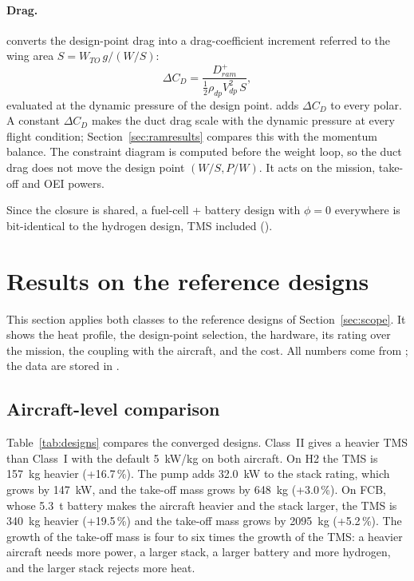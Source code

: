 \documentclass[a4paper,11pt]{article}
\begin{document}
\paragraph{Drag.}  converts the design-point drag into a
drag-coefficient increment referred to the wing area $S = W_{TO}\,g/(W/S)$:
\begin{equation}
  \Delta C_D = \frac{D_{ram}^{+}}{\tfrac12\rho_{dp}V_{dp}^2\,S},
  \label{eq:dcd}
\end{equation}
evaluated at the dynamic pressure of the design point.  adds
$\Delta C_D$ to every polar. A constant $\Delta C_D$ makes the duct drag scale with the
dynamic pressure at every flight condition; Section~\ref{sec:ramresults} compares this with
the momentum balance. The constraint diagram is computed before the weight loop, so the duct
drag does not move the design point $(W/S, P/W)$. It acts on the mission, take-off and OEI
powers.

Since the closure is shared, a fuel-cell + battery design with $\phi = 0$ everywhere is
bit-identical to the hydrogen design, TMS included
().

\section{Results on the reference designs}\label{sec:results}

This section applies both classes to the reference designs of Section~\ref{sec:scope}. It
shows the heat profile, the design-point selection, the hardware, its rating over the
mission, the coupling with the aircraft, and the cost. All numbers come from
; the data are stored in
.

\subsection{Aircraft-level comparison}
Table~\ref{tab:designs} compares the converged designs. Class~II gives a heavier TMS than
Class~I with the default \SI{5}{kW/kg} on both aircraft. On H2 the TMS is \SI{157}{kg}
heavier (+16.7\,\%). The pump adds \SI{32.0}{kW} to the stack rating, which grows by
\SI{147}{kW}, and the take-off mass grows by \SI{648}{kg} (+3.0\,\%). On FCB, whose
\SI{5.3}{t} battery makes the aircraft heavier and the stack larger, the TMS is
\SI{340}{kg} heavier (+19.5\,\%) and the take-off mass grows by \SI{2095}{kg} (+5.2\,\%).
The growth of the take-off mass is four to six times the growth of the TMS: a heavier
aircraft needs more power, a larger stack, a larger battery and more hydrogen, and the
larger stack rejects more heat.
\end{document}
